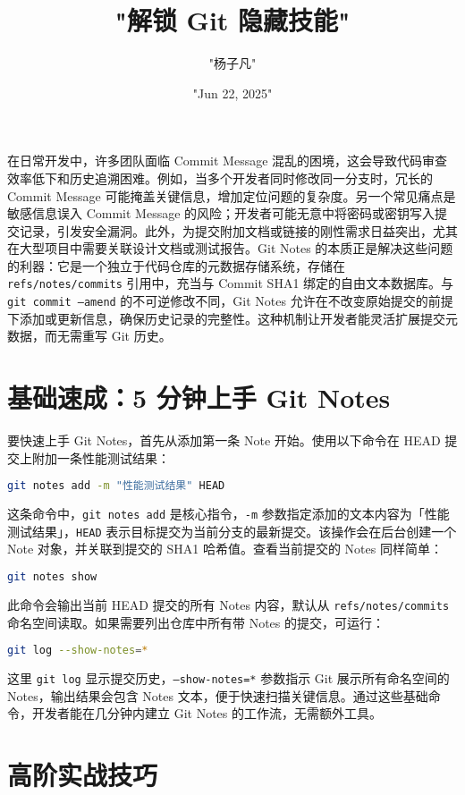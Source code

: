 \title{"解锁 Git 隐藏技能"}
\author{"杨子凡"}
\date{"Jun 22, 2025"}
\maketitle
在日常开发中，许多团队面临 Commit Message 混乱的困境，这会导致代码审查效率低下和历史追溯困难。例如，当多个开发者同时修改同一分支时，冗长的 Commit Message 可能掩盖关键信息，增加定位问题的复杂度。另一个常见痛点是敏感信息误入 Commit Message 的风险；开发者可能无意中将密码或密钥写入提交记录，引发安全漏洞。此外，为提交附加文档或链接的刚性需求日益突出，尤其在大型项目中需要关联设计文档或测试报告。Git Notes 的本质正是解决这些问题的利器：它是一个独立于代码仓库的元数据存储系统，存储在 \texttt{refs/notes/commits} 引用中，充当与 Commit SHA1 绑定的自由文本数据库。与 \texttt{git commit --amend} 的不可逆修改不同，Git Notes 允许在不改变原始提交的前提下添加或更新信息，确保历史记录的完整性。这种机制让开发者能灵活扩展提交元数据，而无需重写 Git 历史。\par
\chapter{基础速成：5 分钟上手 Git Notes}
要快速上手 Git Notes，首先从添加第一条 Note 开始。使用以下命令在 HEAD 提交上附加一条性能测试结果：\par
\begin{lstlisting}[language=bash]
git notes add -m "性能测试结果" HEAD
\end{lstlisting}
这条命令中，\texttt{git notes add} 是核心指令，\texttt{-m} 参数指定添加的文本内容为「性能测试结果」，\texttt{HEAD} 表示目标提交为当前分支的最新提交。该操作会在后台创建一个 Note 对象，并关联到提交的 SHA1 哈希值。查看当前提交的 Notes 同样简单：\par
\begin{lstlisting}[language=bash]
git notes show
\end{lstlisting}
此命令会输出当前 HEAD 提交的所有 Notes 内容，默认从 \texttt{refs/notes/commits} 命名空间读取。如果需要列出仓库中所有带 Notes 的提交，可运行：\par
\begin{lstlisting}[language=bash]
git log --show-notes=*
\end{lstlisting}
这里 \texttt{git log} 显示提交历史，\texttt{--show-notes=*} 参数指示 Git 展示所有命名空间的 Notes，输出结果会包含 Notes 文本，便于快速扫描关键信息。通过这些基础命令，开发者能在几分钟内建立 Git Notes 的工作流，无需额外工具。\par
\chapter{高阶实战技巧}
